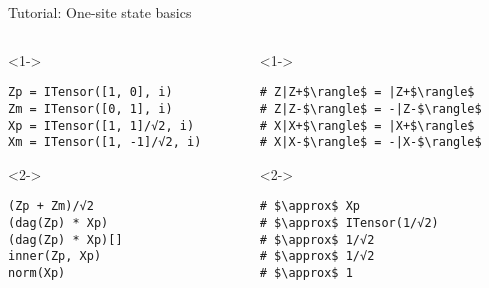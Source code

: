 \begin{frame}[fragile]{Tutorial: One-site state basics}

\begin{columns}

\begin{column}{4.5cm}

\begin{onlyenv}<1->

\begin{lstlisting}[language=JuliaLocal, style=julia, basicstyle=\small]
Zp = ITensor([1, 0], i)
Zm = ITensor([0, 1], i)
Xp = ITensor([1, 1]/√2, i) 
Xm = ITensor([1, -1]/√2, i) 
\end{lstlisting}

\end{onlyenv}

\begin{onlyenv}<2->

\begin{lstlisting}[language=JuliaLocal, style=julia, basicstyle=\small]
(Zp + Zm)/√2
(dag(Zp) * Xp)
(dag(Zp) * Xp)[]
inner(Zp, Xp)
norm(Xp)
\end{lstlisting}

\end{onlyenv}

\end{column}

\begin{column}{4.5cm}

\begin{onlyenv}<1->

\begin{lstlisting}[style=julia, numbers=none, mathescape, basicstyle=\small]
# Z|Z+$\rangle$ = |Z+$\rangle$
# Z|Z-$\rangle$ = -|Z-$\rangle$
# X|X+$\rangle$ = |X+$\rangle$
# X|X-$\rangle$ = -|X-$\rangle$
\end{lstlisting}

\end{onlyenv}

\begin{onlyenv}<2->

\begin{lstlisting}[style=julia, numbers=none, mathescape, basicstyle=\small]
# $\approx$ Xp
# $\approx$ ITensor(1/√2)
# $\approx$ 1/√2
# $\approx$ 1/√2
# $\approx$ 1
\end{lstlisting}

\end{onlyenv}

\end{column}

\end{columns}

\end{frame}
